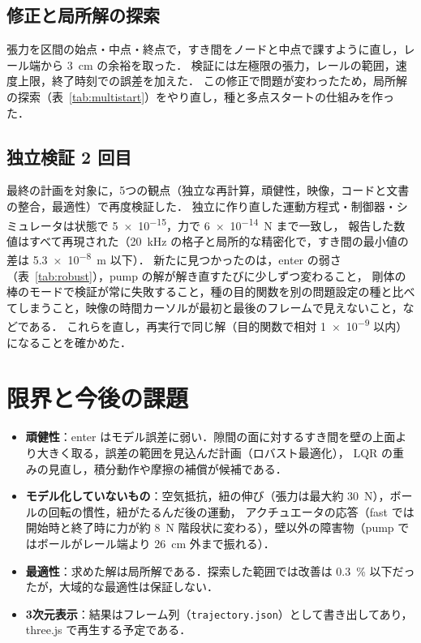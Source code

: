 \documentclass[a4paper,10pt]{ltjsarticle}
\newcommand{\tabref}[1]{表~\ref{#1}}
\newcommand{\code}[1]{\texttt{#1}}
\begin{document}
\subsection{修正と局所解の探索}

張力を区間の始点・中点・終点で，すき間をノードと中点で課すように直し，レール端から \SI{3}{cm} の余裕を取った．
検証には左極限の張力，レールの範囲，速度上限，終了時刻での誤差を加えた．
この修正で問題が変わったため，局所解の探索（\tabref{tab:multistart}）をやり直し，種と多点スタートの仕組みを作った．

\subsection{独立検証 2 回目}

最終の計画を対象に，5つの観点（独立な再計算，頑健性，映像，コードと文書の整合，最適性）で再度検証した．
独立に作り直した運動方程式・制御器・シミュレータは状態で \num{5e-15}，力で \SI{6e-14}{N} まで一致し，
報告した数値はすべて再現された（\SI{20}{kHz} の格子と局所的な精密化で，すき間の最小値の差は \SI{5.3e-8}{m} 以下）．
新たに見つかったのは，enter の弱さ（\tabref{tab:robust}），pump の解が解き直すたびに少しずつ変わること，
剛体の棒のモードで検証が常に失敗すること，種の目的関数を別の問題設定の種と比べてしまうこと，映像の時間カーソルが最初と最後のフレームで見えないこと，などである．
これらを直し，再実行で同じ解（目的関数で相対 \num{1e-9} 以内）になることを確かめた．

\section{限界と今後の課題}

\begin{itemize}
  \item \textbf{頑健性}：enter はモデル誤差に弱い．隙間の面に対するすき間を壁の上面より大きく取る，誤差の範囲を見込んだ計画（ロバスト最適化），
        LQR の重みの見直し，積分動作や摩擦の補償が候補である．
  \item \textbf{モデル化していないもの}：空気抵抗，紐の伸び（張力は最大約 \SI{30}{N}），ボールの回転の慣性，紐がたるんだ後の運動，
        アクチュエータの応答（fast では開始時と終了時に力が約 \SI{8}{N} 階段状に変わる），壁以外の障害物（pump ではボールがレール端より \SI{26}{cm} 外まで振れる）．
  \item \textbf{最適性}：求めた解は局所解である．探索した範囲では改善は \SI{0.3}{\%} 以下だったが，大域的な最適性は保証しない．
  \item \textbf{3次元表示}：結果はフレーム列（\code{trajectory.json}）として書き出してあり，three.js で再生する予定である．
\end{itemize}
\end{document}
